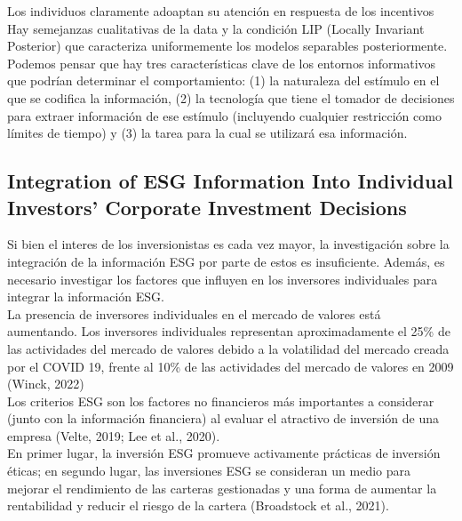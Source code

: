 \documentclass[11pt,letterpaper]{article}
\begin{document}
Los individuos claramente adoaptan su atención en respuesta de los incentivos\\

Hay semejanzas cualitativas de la data  y la condición LIP (Locally Invariant Posterior) que caracteriza uniformemente los modelos separables posteriormente.\\

Podemos pensar que hay tres características clave de los entornos informativos que podrían determinar el comportamiento: (1) la naturaleza del estímulo en el que se codifica la información, (2) la tecnología que tiene el tomador de decisiones para extraer información de ese estímulo (incluyendo cualquier restricción como límites de tiempo) y (3) la tarea para la cual se utilizará esa información.\\

\subsection{Integration of ESG Information Into Individual Investors' Corporate Investment Decisions}

Si bien el interes de los inversionistas es cada vez mayor, la investigación sobre la integración de la información ESG por parte de estos es insuficiente. Además, es necesario investigar los factores que influyen en los inversores individuales para integrar la información ESG.\\

La presencia de inversores individuales en el mercado de valores está aumentando. Los inversores individuales representan aproximadamente el 25\% de las actividades del mercado de valores debido a la volatilidad del mercado creada por el COVID 19, frente al 10\% de las actividades del mercado de valores en 2009 (Winck, 2022)\\

Los criterios ESG son los factores no financieros más importantes a considerar (junto con la información financiera) al evaluar el atractivo de inversión de una empresa (Velte, 2019; Lee et al., 2020).\\

En primer lugar, la inversión ESG promueve activamente prácticas de inversión éticas; en segundo lugar, las inversiones ESG se consideran un medio para mejorar el rendimiento de las carteras gestionadas y una forma de aumentar la rentabilidad y reducir el riesgo de la cartera (Broadstock et al., 2021).\\
\end{document}
